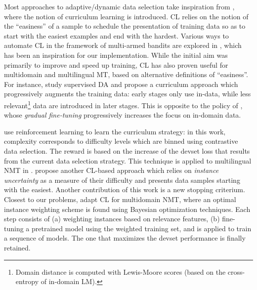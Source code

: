 \documentclass[11pt]{article}
\newcommand{\fyDone}[1]{\done[FY]\Todo[FY:]{\textcolor{orange}{#1}}}
\begin{document}
Most approaches to adaptive/dynamic data selection take inspiration from , where the notion of curriculum learning is introduced. CL relies on the notion of the ``easiness'' of a sample to schedule the presentation of training data so as to start with the easiest examples and end with the hardest. Various ways to automate CL in the framework of multi-armed bandits are explored in , which has been an inspiration for our implementation. While the initial aim was primarily to improve and speed up training, CL has also proven useful for multidomain and multilingual MT, based on alternative definitions of ``easiness''.\fyDone{Ajouter Grave}
For instance,  study supervised DA and propose a curriculum approach which progressively augments the training data: early stages only use in-data, while less relevant\footnote{Domain distance is computed with Lewis-Moore scores (based on the cross-entropy of in-domain LM).} data are introduced in later stages. This is opposite to the policy of , whose \emph{gradual fine-tuning} progressively increases the focus on in-domain data.\fyDone{These have not been compared? and also to what we do ?} 

 use reinforcement learning to learn the curriculum strategy: in this work, complexity corresponds to difficulty levels which are binned using contrastive data selection. The reward is based on the increase of the devset loss that results from the current data selection strategy.\fyDone{Alert: what do we do during warm-up ?} This technique is applied to multilingual NMT in .  propose another CL-based approach which relies on \emph{instance uncertainty} as a measure of their difficulty and presents data samples starting with the easiest. Another contribution of this work is a new stopping criterium. Closest to our problems,  adapt CL for multidomain NMT, where an optimal instance weighting scheme is found using Bayesian optimization techniques. Each step consists of (a) weighting instances based on relevance features, (b) fine-tuning a pretrained model using the weighted training set, and is applied to train a sequence of models. The one that maximizes the devset performance is finally retained.
\end{document}
